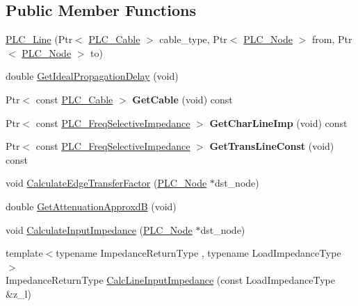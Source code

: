 \subsection*{\-Public \-Member \-Functions}
\begin{DoxyCompactItemize}
\item 
\hyperlink{classns3_1_1PLC__Line_a0cc696d94455b11e4e7fdcd8ba643498}{\-P\-L\-C\-\_\-\-Line} (\-Ptr$<$ \hyperlink{classns3_1_1PLC__Cable}{\-P\-L\-C\-\_\-\-Cable} $>$ cable\-\_\-type, \-Ptr$<$ \hyperlink{classns3_1_1PLC__Node}{\-P\-L\-C\-\_\-\-Node} $>$ from, \-Ptr$<$ \hyperlink{classns3_1_1PLC__Node}{\-P\-L\-C\-\_\-\-Node} $>$ to)
\item 
double \hyperlink{classns3_1_1PLC__Line_a477c77becc30d44916269b10a02bf0c7}{\-Get\-Ideal\-Propagation\-Delay} (void)
\item 
\hypertarget{classns3_1_1PLC__Line_a8dda1611f3de351fe1df0c15f6ce6deb}{\-Ptr$<$ const \hyperlink{classns3_1_1PLC__Cable}{\-P\-L\-C\-\_\-\-Cable} $>$ {\bfseries \-Get\-Cable} (void) const }\label{classns3_1_1PLC__Line_a8dda1611f3de351fe1df0c15f6ce6deb}

\item 
\hypertarget{classns3_1_1PLC__Line_a8cc584bac90f608af35cc4934326d925}{\-Ptr$<$ const \*
\hyperlink{classns3_1_1PLC__FreqSelectiveValue}{\-P\-L\-C\-\_\-\-Freq\-Selective\-Impedance} $>$ {\bfseries \-Get\-Char\-Line\-Imp} (void) const }\label{classns3_1_1PLC__Line_a8cc584bac90f608af35cc4934326d925}

\item 
\hypertarget{classns3_1_1PLC__Line_abdb95fb7ad258c039cc3eac96f132e7b}{\-Ptr$<$ const \*
\hyperlink{classns3_1_1PLC__FreqSelectiveValue}{\-P\-L\-C\-\_\-\-Freq\-Selective\-Impedance} $>$ {\bfseries \-Get\-Trans\-Line\-Const} (void) const }\label{classns3_1_1PLC__Line_abdb95fb7ad258c039cc3eac96f132e7b}

\item 
void \hyperlink{classns3_1_1PLC__Line_a10f17c1ab8e3d6b32b26886df64259da}{\-Calculate\-Edge\-Transfer\-Factor} (\hyperlink{classns3_1_1PLC__Node}{\-P\-L\-C\-\_\-\-Node} $\ast$dst\-\_\-node)
\item 
double \hyperlink{classns3_1_1PLC__Line_ae4981c65ab02bcfb414ff5db42e9a69c}{\-Get\-Attenuation\-Approxd\-B} (void)
\item 
void \hyperlink{classns3_1_1PLC__Line_a8e6afa7dbbc769b9dcae32b3929c3c7c}{\-Calculate\-Input\-Impedance} (\hyperlink{classns3_1_1PLC__Node}{\-P\-L\-C\-\_\-\-Node} $\ast$dst\-\_\-node)
\item 
{\footnotesize template$<$typename Impedance\-Return\-Type , typename Load\-Impedance\-Type $>$ }\\\-Impedance\-Return\-Type \hyperlink{classns3_1_1PLC__Line_aaff1b993c3d103d52dde53155fcb1787}{\-Calc\-Line\-Input\-Impedance} (const \-Load\-Impedance\-Type \&z\-\_\-l)
\end{DoxyCompactItemize}
